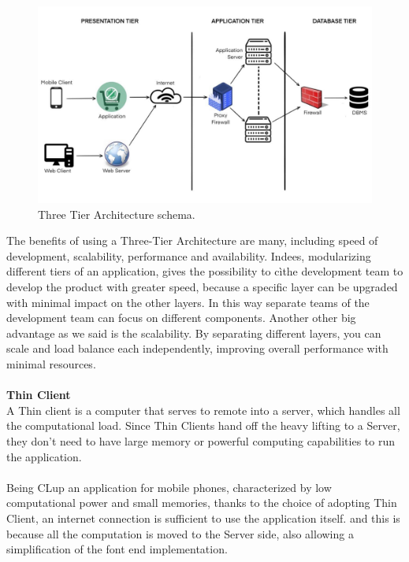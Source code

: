 \documentclass[a4paper, 12pt, oneside, table]{article}
\begin{document}
\begin{figure}[h!]
\centering
	\centering
  	\includegraphics[height=0.35\textheight, scale=0.2, keepaspectratio]{img/three_tier_architecture.jpg} 
	\caption{Three Tier Architecture schema.}
 	\label{three_tier_architecture}
\end{figure}
The benefits of using a Three-Tier Architecture are many, including speed of development, scalability, performance and availability. Indees, modularizing different tiers of an application, gives the possibility to cìthe development team to develop the product with greater speed, because a specific layer can be upgraded with minimal impact on the other layers. In this way separate teams of the development team can focus on different components. Another other big advantage as we said is the scalability. By separating different layers, you can scale and load balance each independently, improving overall performance with minimal resources.\\
\\
\textbf{Thin Client}\\
A Thin client is a computer that serves to remote into a server, which handles all the computational load. Since Thin Clients hand off the heavy lifting to a Server, they don't need to have large memory or powerful computing capabilities to run the application.\\
\\
Being CLup an application for mobile phones, characterized by low computational power and small memories, thanks to the choice of adopting Thin Client, an internet connection is sufficient to use the application itself. and this is because all the computation is moved to the Server side, also allowing a simplification of the font end implementation.\\
\end{document}
